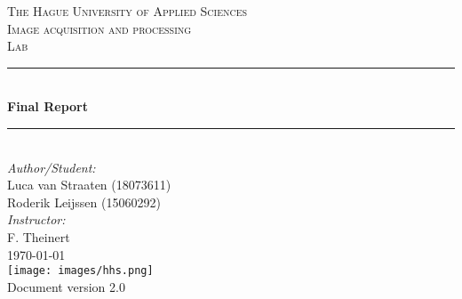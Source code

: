 \documentclass[a4paper]{article}
\begin{document}
\begin{titlepage}

\newcommand{\HRule}{\rule{\linewidth}{0.5mm}} 							%
\center 
 
\textsc{\LARGE The Hague University of Applied Sciences}\\[1cm]

\textsc{\Large Image acquisition and processing}\\[0.2cm]
\textsc{\large Lab}\\[1cm] 										%
\HRule \\[0.8cm]
{ \huge \bfseries Final Report}\\[0.7cm]								%
\HRule \\[2cm]
\large
\emph{Author/Student:}\\
Luca van Straaten (18073611)\\													%
Roderik Leijssen (15060292)\\[1.5cm]
\emph{Instructor:}\\
F.  Theinert\\[1.5cm]										
{\large \today}\\[5cm]
\texttt{[image: images/hhs.png]}\\[1cm] 	%
\vfill
Document version 2.0
\end{titlepage}


\newpage
  \tableofcontents
\newpage
{}


\graphicspath{ {./images/} }
\renewcommand{\thesubsection}{\thesection.\alph{subsection}}

\setcounter{section}{-1}









\end{document}
